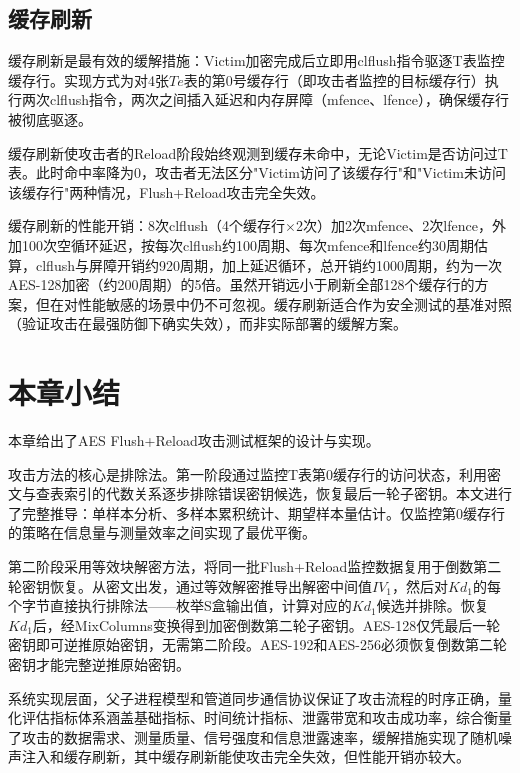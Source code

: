 \subsection{缓存刷新}

缓存刷新是最有效的缓解措施：Victim加密完成后立即用clflush指令驱逐T表监控缓存行。实现方式为对4张$Te$表的第0号缓存行（即攻击者监控的目标缓存行）执行两次clflush指令，两次之间插入延迟和内存屏障（mfence、lfence），确保缓存行被彻底驱逐。

缓存刷新使攻击者的Reload阶段始终观测到缓存未命中，无论Victim是否访问过T表。此时命中率降为0，攻击者无法区分"Victim访问了该缓存行"和"Victim未访问该缓存行"两种情况，Flush+Reload攻击完全失效。

缓存刷新的性能开销：8次clflush（4个缓存行$\times$2次）加2次mfence、2次lfence，外加100次空循环延迟，按每次clflush约100周期、每次mfence和lfence约30周期估算，clflush与屏障开销约920周期，加上延迟循环，总开销约1000周期，约为一次AES-128加密（约200周期）的5倍。虽然开销远小于刷新全部128个缓存行的方案，但在对性能敏感的场景中仍不可忽视。缓存刷新适合作为安全测试的基准对照（验证攻击在最强防御下确实失效），而非实际部署的缓解方案。

\section{本章小结}

本章给出了AES Flush+Reload攻击测试框架的设计与实现。

攻击方法的核心是排除法。第一阶段通过监控T表第0缓存行的访问状态，利用密文与查表索引的代数关系逐步排除错误密钥候选，恢复最后一轮子密钥。本文进行了完整推导：单样本分析、多样本累积统计、期望样本量估计。仅监控第0缓存行的策略在信息量与测量效率之间实现了最优平衡。

第二阶段采用等效块解密方法，将同一批Flush+Reload监控数据复用于倒数第二轮密钥恢复。从密文出发，通过等效解密推导出解密中间值$IV_1$，然后对$Kd_1$的每个字节直接执行排除法——枚举S盒输出值，计算对应的$Kd_1$候选并排除。恢复$Kd_1$后，经MixColumns变换得到加密倒数第二轮子密钥。AES-128仅凭最后一轮密钥即可逆推原始密钥，无需第二阶段。AES-192和AES-256必须恢复倒数第二轮密钥才能完整逆推原始密钥。

系统实现层面，父子进程模型和管道同步通信协议保证了攻击流程的时序正确，量化评估指标体系涵盖基础指标、时间统计指标、泄露带宽和攻击成功率，综合衡量了攻击的数据需求、测量质量、信号强度和信息泄露速率，缓解措施实现了随机噪声注入和缓存刷新，其中缓存刷新能使攻击完全失效，但性能开销亦较大。
